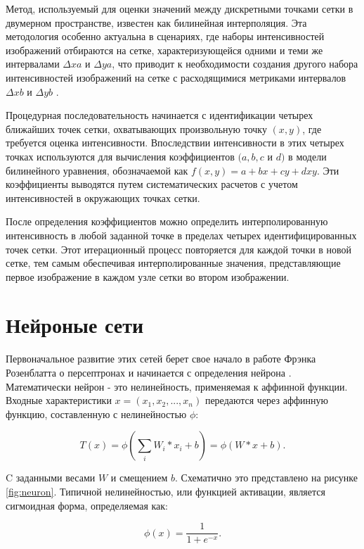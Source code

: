 Метод, используемый для оценки значений между дискретными точками сетки в двумерном пространстве, известен как билинейная интерполяция. Эта методология особенно актуальна в сценариях, где наборы интенсивностей изображений отбираются на сетке, характеризующейся одними и теми же интервалами \(\Delta xa \) и \(\Delta ya\), что приводит к необходимости создания другого набора интенсивностей изображений на сетке с расходящимися метриками интервалов \(\Delta xb\) и \(\Delta yb\) \cite{kirkland2010bilinear}.

Процедурная последовательность начинается с идентификации четырех ближайших точек сетки, охватывающих произвольную точку \((x,y)\), где требуется оценка интенсивности. Впоследствии интенсивности в этих четырех точках используются для вычисления коэффициентов \((a, b, c\) и \(d)\) в модели билинейного уравнения, обозначаемой как \(f(x,y) = a + bx + cy + dxy\). Эти коэффициенты выводятся путем систематических расчетов с учетом интенсивностей в окружающих точках сетки.

После определения коэффициентов можно определить интерполированную интенсивность в любой заданной точке в пределах четырех идентифицированных точек сетки. Этот итерационный процесс повторяется для каждой точки в новой сетке, тем самым обеспечивая интерполированные значения, представляющие первое изображение в каждом узле сетки во втором изображении.

\section{Нейроные сети}

Первоначальное развитие этих сетей берет свое начало в работе Фрэнка Розенблатта о персептронах и начинается с определения нейрона \cite{DOU2023484}. Математически нейрон - это нелинейность, применяемая к аффинной функции. Входные характеристики \(x = (x_1, x_2, . . . , x_n)\) передаются через аффинную функцию, составленную с нелинейностью \(\phi\):

\begin{equation}
    T(x) = \phi\left(\sum_{i} W_{i} \ast x_{i} + b\right) = \phi(W \ast x + b).
\end{equation}

C заданными весами \(W\) и смещением \(b\). Схематично это представлено на рисунке \ref{fig:neuron}. Типичной нелинейностью, или функцией активации, является сигмоидная форма, определяемая как:

\begin{equation}
    \phi(x) = \frac{1}{1 + e^{-x}}.
\end{equation}

